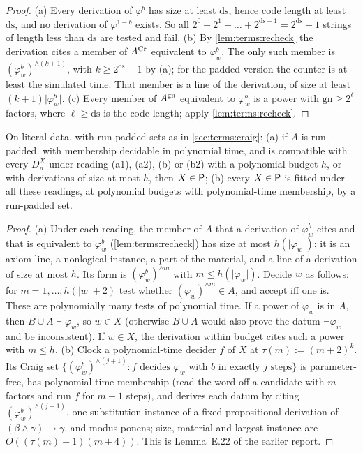 \begin{proof}
(a) Every derivation of $\varphi^b$ has size at least $\mathrm{ds}$, hence code length at least $\mathrm{ds}$, and no derivation of $\varphi^{1-b}$ exists. So all $2^0+2^1+\dots+2^{\mathrm{ds}-1}=2^{\mathrm{ds}}-1$ strings of length less than $\mathrm{ds}$ are tested and fail. (b) By \cref{lem:terms:recheck} the derivation cites a member of $A^{\rm Cr}$ equivalent to $\varphi_w^b$. The only such member is $(\varphi_w^b)^{\wedge(k+1)}$, with $k\ge2^{\mathrm{ds}}-1$ by (a); for the padded version the counter is at least the simulated time. That member is a line of the derivation, of size at least $(k+1)\lvert\varphi_w^b\rvert$. (c) Every member of $A^{\rm gn}$ equivalent to $\varphi_w^b$ is a power with $\mathrm{gn}\ge2^\ell$ factors, where $\ell\ge\mathrm{ds}$ is the code length; apply \cref{lem:terms:recheck}.
\end{proof}

\begin{theorem}\label{thm:terms:padded}
On literal data, with run-padded sets as in \cref{sec:terms:craig}: (a) if $A$ is run-padded, with membership decidable in polynomial time, and is compatible with every $D^X_n$ under reading (a1), (a2), (b) or (b2) with a polynomial budget $h$, or with derivations of size at most $h$, then $X\in\mathsf{P}$; (b) every $X\in\mathsf{P}$ is fitted under all these readings, at polynomial budgets with polynomial-time membership, by a run-padded set.
\end{theorem}

\begin{proof}
(a) Under each reading, the member of $A$ that a derivation of $\varphi_w^b$ cites and that is equivalent to $\varphi_w^b$ (\cref{lem:terms:recheck}) has size at most $h(\lvert\varphi_w\rvert)$: it is an axiom line, a nonlogical instance, a part of the material, and a line of a derivation of size at most $h$. Its form is $(\varphi_w^b)^{\wedge m}$ with $m\le h(\lvert\varphi_w\rvert)$. Decide $w$ as follows: for $m=1,\dots,h(\lvert w\rvert+2)$ test whether $(\varphi_w)^{\wedge m}\in A$, and accept iff one is. These are polynomially many tests of polynomial time. If a power of $\varphi_w$ is in $A$, then $B\cup A\vdash\varphi_w$, so $w\in X$ (otherwise $B\cup A$ would also prove the datum $\neg\varphi_w$ and be inconsistent). If $w\in X$, the derivation within budget cites such a power with $m\le h$.
(b) Clock a polynomial-time decider $f$ of $X$ at $\tau(m):=(m+2)^k$. Its Craig set $\{(\varphi_w^b)^{\wedge(j+1)}:f\text{ decides }\varphi_w\text{ with }b\text{ in exactly }j\text{ steps}\}$ is parameter-free, has polynomial-time membership (read the word off a candidate with $m$ factors and run $f$ for $m-1$ steps), and derives each datum by citing $(\varphi_w^b)^{\wedge(j+1)}$, one substitution instance of a fixed propositional derivation of $(\beta\wedge\gamma)\to\gamma$, and modus ponens; size, material and largest instance are $O((\tau(m)+1)(m+4))$. This is Lemma~E.22 of the earlier report.
\end{proof}

